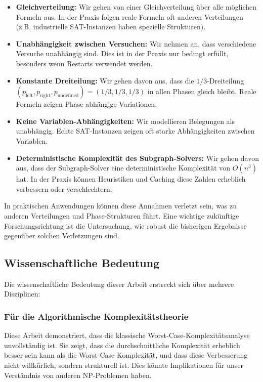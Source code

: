 ﻿\documentclass[a4paper,12pt]{article}
\theoremstyle{definition}
\begin{document}
\begin{itemize}
	\item \textbf{Gleichverteilung:} Wir gehen von einer Gleichverteilung über alle möglichen Formeln aus. In der Praxis folgen reale Formeln oft anderen Verteilungen (z.B. industrielle SAT-Instanzen haben spezielle Strukturen).
	
	\item \textbf{Unabhängigkeit zwischen Versuchen:} Wir nehmen an, dass verschiedene Versuche unabhängig sind. Dies ist in der Praxis nur bedingt erfüllt, besonders wenn Restarts verwendet werden.
	
	\item \textbf{Konstante Dreiteilung:} Wir gehen davon aus, dass die $1/3$-Dreiteilung $(p_{\text{left}}, p_{\text{right}}, p_{\text{undefined}}) = (1/3, 1/3, 1/3)$ in allen Phasen gleich bleibt. Reale Formeln zeigen Phase-abhängige Variationen.
	
	\item \textbf{Keine Variablen-Abhängigkeiten:} Wir modellieren Belegungen als unabhängig. Echte SAT-Instanzen zeigen oft starke Abhängigkeiten zwischen Variablen.
	
	\item \textbf{Deterministische Komplexität des Subgraph-Solvers:} Wir gehen davon aus, dass der Subgraph-Solver eine deterministische Komplexität von $O(n^3)$ hat. In der Praxis können Heuristiken und Caching diese Zahlen erheblich verbessern oder verschlechtern.
\end{itemize}

In praktischen Anwendungen können diese Annahmen verletzt sein, was zu anderen Verteilungen und Phase-Strukturen führt. Eine wichtige zukünftige Forschungsrichtung ist die Untersuchung, wie robust die bisherigen Ergebnisse gegenüber solchen Verletzungen sind.

\subsection{Wissenschaftliche Bedeutung}

Die wissenschaftliche Bedeutung dieser Arbeit erstreckt sich über mehrere Disziplinen:

\subsubsection{Für die Algorithmische Komplexitätstheorie}

Diese Arbeit demonstriert, dass die klassische Worst-Case-Komplexitätsanalyse unvollständig ist. Sie zeigt, dass die durchschnittliche Komplexität erheblich besser sein kann als die Worst-Case-Komplexität, und dass diese Verbesserung nicht willkürlich, sondern strukturell ist. Dies könnte Implikationen für unser Verständnis von anderen NP-Problemen haben.
\end{document}
